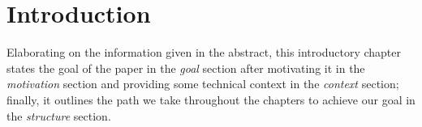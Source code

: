\chapter{Introduction}
Elaborating on the information given in the abstract,
this introductory chapter
states the goal of the paper in the \textit{goal} section
after motivating it in the \textit{motivation} section
and providing some technical context in the \textit{context} section;
finally, it outlines the path we take throughout the chapters
to achieve our goal in the \textit{structure} section.








